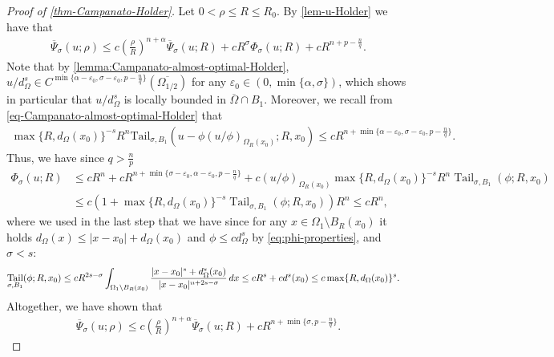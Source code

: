 \documentclass[11pt,reqno]{amsart}
\theoremstyle{plain}
\theoremstyle{definition}
\numberwithin{equation}{section}
\newcommand{\eps}{\varepsilon}
\newcommand{\1}{\mathbbm{1}}
\DeclareMathOperator{\tail}{Tail}
\renewcommand{\d}{\textnormal{\,d}}
\begin{document}
\begin{proof}[Proof of \autoref{thm-Campanato-Holder}]
Let $0<\rho\leq R\leq R_0$. By \autoref{lem-u-Holder} we have that
\begin{align*}
\overline{\Psi}_\sigma(u; \rho) \leq c \left( \frac{\rho}{R} \right)^{n+\alpha} \overline{\Psi}_\sigma(u; R) + cR^{\sigma} \Phi_{\sigma}(u; R) + cR^{n+p-\frac{n}{q}}.
\end{align*}
Note that by \autoref{lemma:Campanato-almost-optimal-Holder}, $u/d_\Omega^s \in C^{\min\{\alpha-\varepsilon_0,\sigma-\varepsilon_0,p-\frac{n}{q}\}}(\overline{\Omega_{1/2}})$ for any $\eps_0 \in (0,\min\{\alpha, \sigma\})$, which shows in particular that $u/d^s_{\Omega}$ is locally bounded in $\overline{\Omega} \cap B_1$. Moreover, we recall from \eqref{eq-Campanato-almost-optimal-Holder} that
\begin{align*}
\max\{R,d_{\Omega}(x_0)\}^{-s} R^n \mathrm{Tail}_{\sigma,B_1}(u - \phi(u/\phi)_{\Omega_{R}(x_0)}; R, x_0) \le c R^{n+\min\{\alpha-\varepsilon_0,\sigma-\varepsilon_0,p-\frac{n}{q}\}}.
\end{align*}
Thus, we have since $q > \frac{n}{p}$
\begin{align*}
\Phi_{\sigma}(u; R)
&\le c R^n + c R^{n+\min\{\sigma-\varepsilon_0,\alpha-\varepsilon_0,p-\frac{n}{q}\}} + c(u/\phi)_{\Omega_R(x_0)} \max\{R,d_{\Omega}(x_0)\}^{-s} R^{n} \tail_{\sigma,B_1}(\phi;R,x_0) \\
&\le c \left( 1 + \max\{R,d_{\Omega}(x_0)\}^{-s}\tail_{\sigma,B_1}(\phi;R,x_0) \right) R^n \le c R^n,
\end{align*}
where we used in the last step that we have since for any $x \in \Omega_1 \setminus B_R(x_0)$ it holds $d_{\Omega}(x) \le |x-x_0| + d_{\Omega}(x_0)$ and $\phi \le c d_{\Omega}^s$ by \eqref{eq:phi-properties}, and $\sigma < s$:
\begin{align*}
\tail_{\sigma,B_1}(\phi;R,x_0)
&\le c R^{2s-\sigma} \int_{\Omega_1 \setminus B_R(x_0)} \frac{|x-x_0|^s+d_\Omega^s(x_0)}{|x-x_0|^{n+2s-\sigma}} \d x \le c R^s + c d^s(x_0) \le c \max\{R,d_{\Omega}(x_0)\}^s.
\end{align*}
Altogether, we have shown that
\begin{align*}
\overline{\Psi}_\sigma(u; \rho) \leq c \left( \frac{\rho}{R} \right)^{n+\alpha} \overline{\Psi}_\sigma(u; R) + c R^{n+\min \{\sigma,p-\frac{n}{q}\}}.
\end{align*}


\end{proof}
\end{document}
